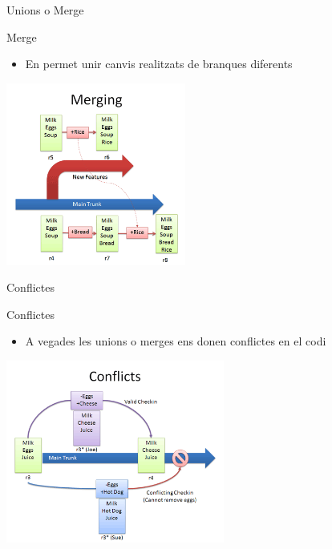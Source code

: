 \documentclass[10pt,xcolor={rgb}]{beamer}
\begin{document}
    \begin{frame}[fragile]{Unions o Merge}
      
            \begin{block}{Merge}
      
              \begin{itemize}
                \item En permet unir canvis realitzats de branques diferents
                
              \end{itemize}

              \centering
              \includegraphics[height=6cm]{merging.png}
      
            \end{block}
      
    \end{frame}

    \begin{frame}[fragile]{Conflictes}
      
            \begin{block}{Conflictes}
      
              \begin{itemize}
                \item A vegades les unions o merges ens donen conflictes en el codi
                
              \end{itemize}

              \centering
              \includegraphics[height=6cm]{vcs_conflict.png}
      
            \end{block}
      
    \end{frame}
    
\end{document}
